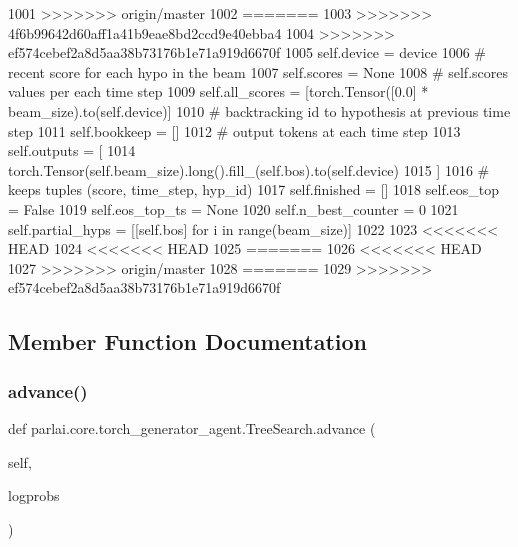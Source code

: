 \begin{DoxyCode}
1001 >>>>>>> origin/master
1002 =======
1003 >>>>>>> 4f6b99642d60aff1a41b9eae8bd2ccd9e40ebba4
1004 >>>>>>> ef574cebef2a8d5aa38b73176b1e71a919d6670f
1005         self.device = device
1006         \textcolor{comment}{# recent score for each hypo in the beam}
1007         self.scores = \textcolor{keywordtype}{None}
1008         \textcolor{comment}{# self.scores values per each time step}
1009         self.all\_scores = [torch.Tensor([0.0] * beam\_size).to(self.device)]
1010         \textcolor{comment}{# backtracking id to hypothesis at previous time step}
1011         self.bookkeep = []
1012         \textcolor{comment}{# output tokens at each time step}
1013         self.outputs = [
1014             torch.Tensor(self.beam\_size).long().fill\_(self.bos).to(self.device)
1015         ]
1016         \textcolor{comment}{# keeps tuples (score, time\_step, hyp\_id)}
1017         self.finished = []
1018         self.eos\_top = \textcolor{keyword}{False}
1019         self.eos\_top\_ts = \textcolor{keywordtype}{None}
1020         self.n\_best\_counter = 0
1021         self.partial\_hyps = [[self.bos] \textcolor{keywordflow}{for} i \textcolor{keywordflow}{in} range(beam\_size)]
1022 
1023 <<<<<<< HEAD
1024 <<<<<<< HEAD
1025 =======
1026 <<<<<<< HEAD
1027 >>>>>>> origin/master
1028 =======
1029 >>>>>>> ef574cebef2a8d5aa38b73176b1e71a919d6670f
\end{DoxyCode}


\subsection{Member Function Documentation}
\mbox{\label{classparlai_1_1core_1_1torch__generator__agent_1_1TreeSearch_a9f371e57095af5b22ff5eae4c57326c8}} 
\subsubsection{\texorpdfstring{advance()}{advance()}}
{\footnotesize\ttfamily def parlai.\+core.\+torch\+\_\+generator\+\_\+agent.\+Tree\+Search.\+advance (\begin{DoxyParamCaption}\item[{}]{self,  }\item[{}]{logprobs }\end{DoxyParamCaption})}


